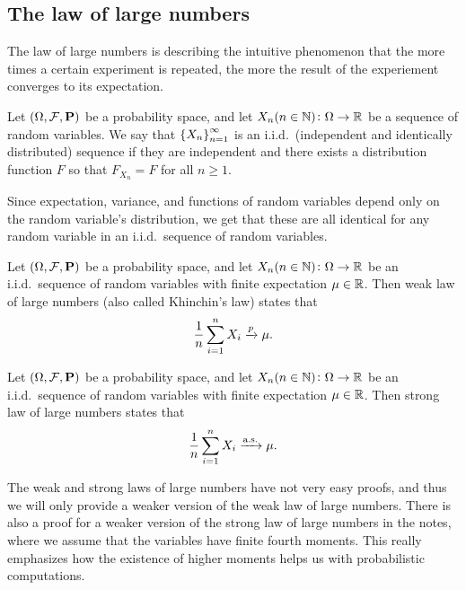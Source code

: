 \documentclass[11pt,a4paper]{article}
\newcommand{\as}{\text{a.s.}}
\begin{document}
\subsection{The law of large numbers}

The law of large numbers is describing the intuitive phenomenon
that the more times a certain experiment is repeated,
the more the result of the experiement converges to its expectation.

\begin{definition}[i.i.d.\ sequence]
  Let $(\Omega, \mathcal F, \mathbf{P})$ be a probability space,
  and let $X_n(n \in \mathbb{N}) \colon \Omega \to \mathbb{R}$ be a sequence of random
  variables.
  We say that $\left\{X_n\right\}_{n=1}^{\infty}$ is an i.i.d.\
  (independent and identically distributed) sequence
  if they are independent and there exists a distribution function $F$
  so that $F_{X_n} = F$ for all $n \geq 1$.
\end{definition}
\begin{remark}
  Since expectation, variance, and functions of random variables
  depend only on the random variable's distribution,
  we get that these are all identical for any random variable
  in an i.i.d.\ sequence of random variables.
\end{remark}

\begin{theorem}
  Let $(\Omega, \mathcal F, \mathbf{P})$ be a probability space,
  and let $X_n(n \in \mathbb{N}) \colon \Omega \to \mathbb{R}$ be an i.i.d.\ sequence of random
  variables with finite expectation $\mu \in \mathbb{R}$.
  Then weak law of large numbers (also called Khinchin's law)
  states that
  \[
    \frac{1}{n} \sum_{i=1}^{n} X_i \xrightarrow{p} \mu.
  \]
\end{theorem}
\begin{theorem}
  Let $(\Omega, \mathcal F, \mathbf{P})$ be a probability space,
  and let $X_n(n \in \mathbb{N}) \colon \Omega \to \mathbb{R}$ be an i.i.d.\ sequence of random
  variables with finite expectation $\mu \in \mathbb{R}$.
  Then strong law of large numbers
  states that
  \[
    \frac{1}{n} \sum_{i=1}^{n} X_i \taking{\as} \mu.
  \]
\end{theorem}

\begin{remark}
  The weak and strong laws of large numbers have not very easy proofs,
  and thus we will only provide a weaker version of the
  weak law of large numbers.
  There is also a proof for a weaker version of the strong law
  of large numbers in the notes,
  where we assume that the variables have finite fourth moments.
  This really emphasizes how the existence of higher moments
  helps us with probabilistic computations.
\end{remark}
\end{document}
